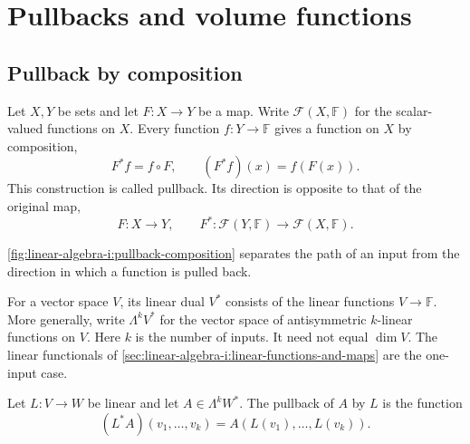 \section{Pullbacks and volume functions}
\label{sec:linear-algebra-i:pullbacks-and-volume-functions}

\subsection{Pullback by composition}

Let \(X,Y\) be sets and let \(F:X\to Y\) be a map. Write
\(\mathcal F(X,\mathbb F)\) for the scalar-valued functions on \(X\).
Every function \(f:Y\to\mathbb F\) gives a function on \(X\) by composition,
\[
  F^*f=f\circ F,\qquad (F^*f)(x)=f(F(x)).
\]
This construction is called pullback. Its direction is opposite to that of
the original map,
\[
  F:X\longrightarrow Y,\qquad
  F^*:\mathcal F(Y,\mathbb F)\longrightarrow\mathcal F(X,\mathbb F).
\]

\autoref{fig:linear-algebra-i:pullback-composition} separates the path
of an input from the direction in which a function is pulled back.
\begin{marginfigure}
  \centering
  
  \caption[Pullback by composition]{In the triangle, start in \(X\),
    apply \(F\), then evaluate \(f\). Below, \(F^*\) takes the function
    \(f\) on \(Y\) back to the function \(F^*f\) on \(X\).}
  \label{fig:linear-algebra-i:pullback-composition}
\end{marginfigure}

For a vector space \(V\), its linear dual \(V^*\) consists of the linear
functions \(V\to\mathbb F\). More generally, write \(\Lambda^k V^*\) for
the vector space of antisymmetric \(k\)-linear functions on \(V\).
Here \(k\) is the number of inputs. It need not equal \(\dim V\).
The linear functionals of
\autoref{sec:linear-algebra-i:linear-functions-and-maps} are the
one-input case.

\begin{definition}
  Let \(L:V\to W\) be linear and let \(A\in\Lambda^k W^*\).
  The pullback of \(A\) by \(L\) is the function
  \[
    (L^*A)(v_1,\ldots,v_k)
      =A(L(v_1),\ldots,L(v_k)).
  \]
\end{definition}

